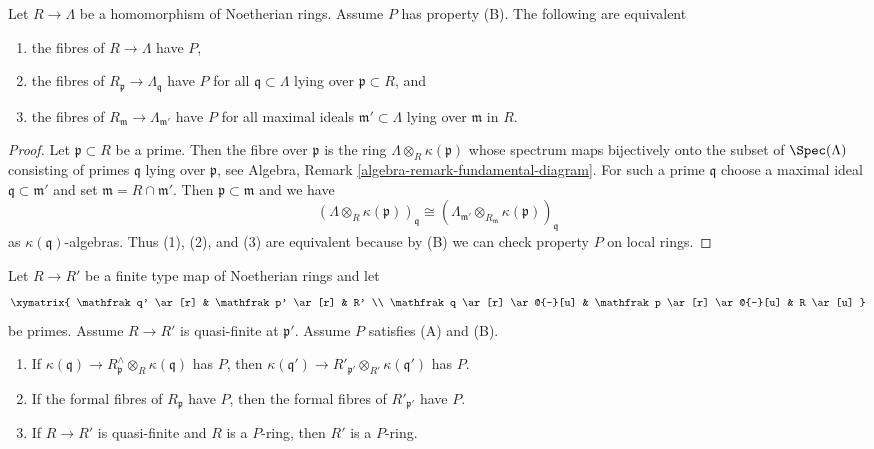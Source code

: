 \begin{lemma}
\label{lemma-P-local}
Let $R \to \Lambda$ be a homomorphism of Noetherian rings.
Assume $P$ has property (B). The following are equivalent
\begin{enumerate}
\item the fibres of $R \to \Lambda$ have $P$,
\item the fibres of $R_\mathfrak p \to \Lambda_\mathfrak q$ have $P$
for all $\mathfrak q \subset \Lambda$ lying over $\mathfrak p \subset R$, and
\item the fibres of $R_\mathfrak m \to \Lambda_{\mathfrak m'}$ have $P$
for all maximal ideals $\mathfrak m' \subset \Lambda$
lying over $\mathfrak m$ in $R$.
\end{enumerate}
\end{lemma}

\begin{proof}
Let $\mathfrak p \subset R$ be a prime. Then the fibre over
$\mathfrak p$ is the ring $\Lambda \otimes_R \kappa(\mathfrak p)$
whose spectrum maps bijectively onto the subset of $\Spec(\Lambda)$
consisting of primes $\mathfrak q$ lying over $\mathfrak p$, see
Algebra, Remark \ref{algebra-remark-fundamental-diagram}.
For such a prime $\mathfrak q$ choose a maximal
ideal $\mathfrak q \subset \mathfrak m'$ and set
$\mathfrak m = R \cap \mathfrak m'$.
Then $\mathfrak p \subset \mathfrak m$ and we have
$$
(\Lambda \otimes_R \kappa(\mathfrak p))_\mathfrak q \cong
(\Lambda_{\mathfrak m'} \otimes_{R_\mathfrak m}
\kappa(\mathfrak p))_\mathfrak q
$$
as $\kappa(\mathfrak q)$-algebras. Thus (1), (2), and (3) are equivalent
because by (B) we can check property $P$ on local rings.
\end{proof}

\begin{lemma}
\label{lemma-P-ring-goes-up-quasi-finite}
Let $R \to R'$ be a finite type map of Noetherian rings and let
$$
\xymatrix{
\mathfrak q' \ar[r] & \mathfrak p' \ar[r] & R' \\
\mathfrak q \ar[r] \ar@{-}[u] &
\mathfrak p \ar[r] \ar@{-}[u] & R \ar[u]
}
$$
be primes. Assume $R \to R'$ is quasi-finite at $\mathfrak p'$.
Assume $P$ satisfies (A) and (B).
\begin{enumerate}
\item If $\kappa(\mathfrak q) \to
R_\mathfrak p^\wedge \otimes_R \kappa(\mathfrak q)$
has $P$, then
$\kappa(\mathfrak q') \to R'_{\mathfrak p'} \otimes_{R'} \kappa(\mathfrak q')$
has $P$.
\item If the formal fibres of $R_\mathfrak p$ have $P$,
then the formal fibres of $R'_{\mathfrak p'}$ have $P$.
\item If $R \to R'$ is quasi-finite and $R$ is a $P$-ring, then $R'$ is
a $P$-ring.
\end{enumerate}
\end{lemma}

